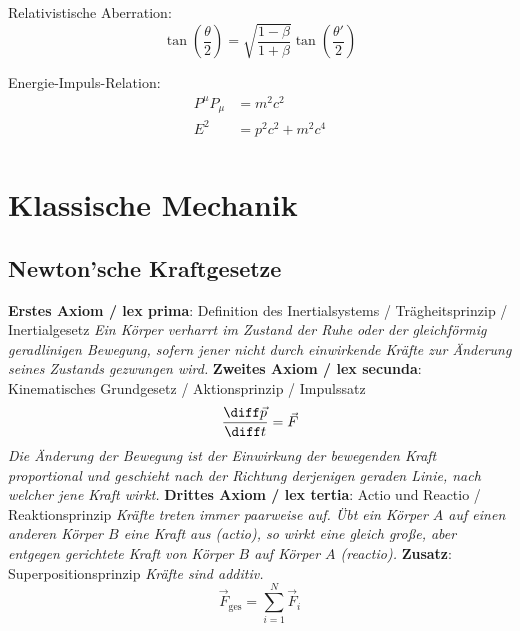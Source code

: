 \documentclass[11pt]{article}
\numberwithin{equation}{section}
\begin{document}
          Relativistische Aberration:
          \begin{equation}
            \tan\left(\frac{\theta}{2}\right) = \sqrt{\frac{1-\beta}{1+\beta}}\tan\left(\frac{\theta'}{2}\right)
          \end{equation}

          Energie-Impuls-Relation:
          \begin{equation}
            \begin{aligned}
              P^\mu P_\mu &= m^2 c^2\\
              E^2 &= p^2 c^2 + m^2 c^4 \\
            \end{aligned}
          \end{equation}
          \newpage

    \section{Klassische Mechanik}
      \subsection{Newton'sche Kraftgesetze}
        \textbf{Erstes Axiom / lex prima}: Definition des Inertialsystems / Trägheitsprinzip / Inertialgesetz \newline
          \indent \emph{Ein Körper verharrt im Zustand der Ruhe oder der gleichförmig geradlinigen Bewegung, sofern jener nicht durch einwirkende Kräfte zur Änderung seines Zustands gezwungen wird.} \nl
        \textbf{Zweites Axiom / lex secunda}: Kinematisches Grundgesetz / Aktionsprinzip / Impulssatz
          \begin{equation}
            \tder{\vec{p}}{t} = \vec{F}
          \end{equation}
          \indent \emph{Die Änderung der Bewegung ist der Einwirkung der bewegenden Kraft proportional und geschieht nach der Richtung derjenigen geraden Linie, nach welcher jene Kraft wirkt.} \nl
        \textbf{Drittes Axiom / lex tertia}: Actio und Reactio / Reaktionsprinzip \newline
          \indent \emph{Kräfte treten immer paarweise auf. Übt ein Körper $A$ auf einen anderen Körper $B$ eine Kraft aus (actio), so wirkt eine gleich große, aber entgegen gerichtete Kraft von Körper $B$ auf Körper $A$ (reactio).} \nl
        \textbf{Zusatz}: Superpositionsprinzip \newline
          \indent \emph{Kräfte sind additiv.}
          \begin{equation}
            \vec{F}_{\mathrm{ges}} = \sum_{i=1}^{N} \vec{F}_i
          \end{equation}
\end{document}
